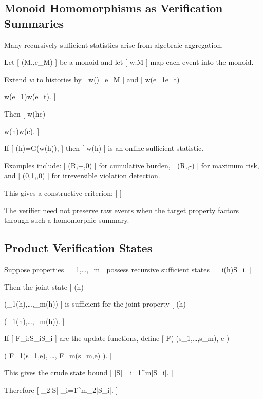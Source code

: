 \documentclass[11pt]{article}
\begin{document}
\subsection{Monoid Homomorphisms as Verification Summaries}

Many recursively sufficient statistics arise from algebraic aggregation.

Let
[
(M,\odot,e_M)
]
be a monoid and let
[
w:\Sigma\to M
]
map each event into the monoid.

Extend $w$ to histories by
[
\overline w(\epsilon)=e_M
]
and
[
\overline w(e_1\cdots e_t)

w(e_1)\odot\cdots\odot w(e_t).
]

Then
[
\overline w(hc)

\overline w(h)\odot\overline w(c).
]

If
[
\Phi(h)=G(\overline w(h)),
]
then
[
\overline w(h)
]
is an online sufficient statistic.

Examples include:
[
(\mathbb R,+,0)
]
for cumulative burden,
[
(\mathbb R\cup{-\infty},\max,-\infty)
]
for maximum risk, and
[
({0,1},\lor,0)
]
for irreversible violation detection.

This gives a constructive criterion:
[
]

The verifier need not preserve raw events when the target property factors through such a homomorphic summary.

\subsection{Product Verification States}

Suppose properties
[
\Phi_1,\ldots,\Phi_m
]
possess recursive sufficient states
[
\sigma_i(h)\in S_i.
]

Then the joint state
[
\sigma(h)

(\sigma_1(h),\ldots,\sigma_m(h))
]
is sufficient for the joint property
[
\mathbf\Phi(h)

(\Phi_1(h),\ldots,\Phi_m(h)).
]

If
[
F_i:S_i\times\Sigma\to S_i
]
are the update functions, define
[
F(
(s_1,\ldots,s_m),
e
)

(
F_1(s_1,e),
\ldots,
F_m(s_m,e)
).
]

This gives the crude state bound
[
|S|
\leq
\prod_{i=1}^{m}|S_i|.
]

Therefore
[
\log_2|S|
\leq
\sum_{i=1}^{m}\log_2|S_i|.
]
\end{document}
